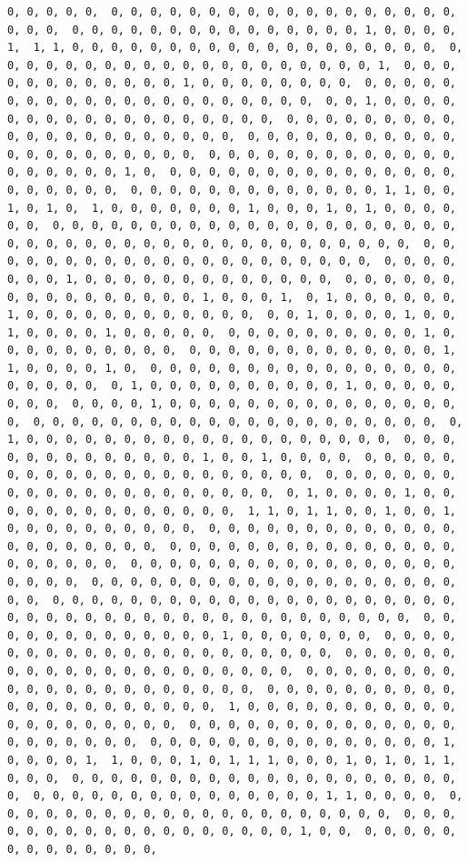 \documentclass[
]{article}
\begin{document}
\begin{verbatim}
0, 0, 0, 0, 0,  0, 0, 0, 0, 0, 0, 0, 0, 0, 0, 0, 0, 0, 0, 0, 0, 0, 0, 0, 0, 0,  0, 0, 0, 0, 0, 0, 0, 0, 0, 0, 0, 0, 0, 0, 0, 1, 0, 0, 0, 0, 1,  1, 1, 0, 0, 0, 0, 0, 0, 0, 0, 0, 0, 0, 0, 0, 0, 0, 0, 0, 0, 0,  0, 0, 0, 0, 0, 0, 0, 0, 0, 0, 0, 0, 0, 0, 0, 0, 0, 0, 0, 0, 1,  0, 0, 0, 0, 0, 0, 0, 0, 0, 0, 0, 0, 1, 0, 0, 0, 0, 0, 0, 0, 0,  0, 0, 0, 0, 0, 0, 0, 0, 0, 0, 0, 0, 0, 0, 0, 0, 0, 0, 0, 0, 0,  0, 0, 1, 0, 0, 0, 0, 0, 0, 0, 0, 0, 0, 0, 0, 0, 0, 0, 0, 0, 0,  0, 0, 0, 0, 0, 0, 0, 0, 0, 0, 0, 0, 0, 0, 0, 0, 0, 0, 0, 0, 0,  0, 0, 0, 0, 0, 0, 0, 0, 0, 0, 0, 0, 0, 0, 0, 0, 0, 0, 0, 0, 0,  0, 0, 0, 0, 0, 0, 0, 0, 0, 0, 0, 0, 0, 0, 0, 0, 0, 0, 0, 1, 0,  0, 0, 0, 0, 0, 0, 0, 0, 0, 0, 0, 0, 0, 0, 0, 0, 0, 0, 0, 0, 0,  0, 0, 0, 0, 0, 0, 0, 0, 0, 0, 0, 0, 0, 1, 1, 0, 0, 1, 0, 1, 0,  1, 0, 0, 0, 0, 0, 0, 0, 1, 0, 0, 0, 1, 0, 1, 0, 0, 0, 0, 0, 0,  0, 0, 0, 0, 0, 0, 0, 0, 0, 0, 0, 0, 0, 0, 0, 0, 0, 0, 0, 0, 0,  0, 0, 0, 0, 0, 0, 0, 0, 0, 0, 0, 0, 0, 0, 0, 0, 0, 0, 0, 0, 0,  0, 0, 0, 0, 0, 0, 0, 0, 0, 0, 0, 0, 0, 0, 0, 0, 0, 0, 0, 0, 0,  0, 0, 0, 0, 0, 0, 0, 1, 0, 0, 0, 0, 0, 0, 0, 0, 0, 0, 0, 0, 0,  0, 0, 0, 0, 0, 0, 0, 0, 0, 0, 0, 0, 0, 0, 0, 0, 1, 0, 0, 0, 1,  0, 1, 0, 0, 0, 0, 0, 0, 1, 0, 0, 0, 0, 0, 0, 0, 0, 0, 0, 0, 0,  0, 0, 1, 0, 0, 0, 0, 1, 0, 0, 1, 0, 0, 0, 0, 1, 0, 0, 0, 0, 0,  0, 0, 0, 0, 0, 0, 0, 0, 0, 0, 1, 0, 0, 0, 0, 0, 0, 0, 0, 0, 0,  0, 0, 0, 0, 0, 0, 0, 0, 0, 0, 0, 0, 0, 1, 1, 0, 0, 0, 0, 1, 0,  0, 0, 0, 0, 0, 0, 0, 0, 0, 0, 0, 0, 0, 0, 0, 0, 0, 0, 0, 0, 0,  0, 1, 0, 0, 0, 0, 0, 0, 0, 0, 0, 0, 1, 0, 0, 0, 0, 0, 0, 0, 0,  0, 0, 0, 0, 1, 0, 0, 0, 0, 0, 0, 0, 0, 0, 0, 0, 0, 0, 0, 0, 0,  0, 0, 0, 0, 0, 0, 0, 0, 0, 0, 0, 0, 0, 0, 0, 0, 0, 0, 0, 0, 0,  0, 1, 0, 0, 0, 0, 0, 0, 0, 0, 0, 0, 0, 0, 0, 0, 0, 0, 0, 0, 0,  0, 0, 0, 0, 0, 0, 0, 0, 0, 0, 0, 0, 0, 1, 0, 0, 1, 0, 0, 0, 0,  0, 0, 0, 0, 0, 0, 0, 0, 0, 0, 0, 0, 0, 0, 0, 0, 0, 0, 0, 0, 0,  0, 0, 0, 0, 0, 0, 0, 0, 0, 0, 0, 0, 0, 0, 0, 0, 0, 0, 0, 0, 0,  0, 1, 0, 0, 0, 0, 1, 0, 0, 0, 0, 0, 0, 0, 0, 0, 0, 0, 0, 0, 0,  1, 1, 0, 1, 1, 0, 0, 1, 0, 0, 1, 0, 0, 0, 0, 0, 0, 0, 0, 0, 0,  0, 0, 0, 0, 0, 0, 0, 0, 0, 0, 0, 0, 0, 0, 0, 0, 0, 0, 0, 0, 0,  0, 0, 0, 0, 0, 0, 0, 0, 0, 0, 0, 0, 0, 0, 0, 0, 0, 0, 0, 0, 0,  0, 0, 0, 0, 0, 0, 0, 0, 0, 0, 0, 0, 0, 0, 0, 0, 0, 0, 0, 0, 0,  0, 0, 0, 0, 0, 0, 0, 0, 0, 0, 0, 0, 0, 0, 0, 0, 0, 0, 0, 0, 0,  0, 0, 0, 0, 0, 0, 0, 0, 0, 0, 0, 0, 0, 0, 0, 0, 0, 0, 0, 0, 0,  0, 0, 0, 0, 0, 0, 0, 0, 0, 0, 0, 0, 0, 0, 0, 0, 0, 0, 0, 0, 0,  0, 0, 0, 0, 0, 0, 0, 0, 0, 0, 0, 0, 0, 1, 0, 0, 0, 0, 0, 0, 0,  0, 0, 0, 0, 0, 0, 0, 0, 0, 0, 0, 0, 0, 0, 0, 0, 0, 0, 0, 0, 0,  0, 0, 0, 0, 0, 0, 0, 0, 0, 0, 0, 0, 0, 0, 0, 0, 0, 0, 0, 0, 0,  0, 0, 0, 0, 0, 0, 0, 0, 0, 0, 0, 0, 0, 0, 0, 0, 0, 0, 0, 0, 0,  0, 0, 0, 0, 0, 0, 0, 0, 0, 0, 0, 0, 0, 0, 0, 0, 0, 0, 0, 0, 0,  1, 0, 0, 0, 0, 0, 0, 0, 0, 0, 0, 0, 0, 0, 0, 0, 0, 0, 0, 0, 0,  0, 0, 0, 0, 0, 0, 0, 0, 0, 0, 0, 0, 0, 0, 0, 0, 0, 0, 0, 0, 0,  0, 0, 0, 0, 0, 0, 0, 0, 0, 0, 0, 0, 0, 0, 0, 1, 0, 0, 0, 0, 1,  1, 0, 0, 0, 1, 0, 1, 1, 1, 0, 0, 0, 1, 0, 1, 0, 1, 1, 0, 0, 0,  0, 0, 0, 0, 0, 0, 0, 0, 0, 0, 0, 0, 0, 0, 0, 0, 0, 0, 0, 0, 0,  0, 0, 0, 0, 0, 0, 0, 0, 0, 0, 0, 0, 0, 0, 0, 1, 1, 0, 0, 0, 0,  0, 0, 0, 0, 0, 0, 0, 0, 0, 0, 0, 0, 0, 0, 0, 0, 0, 0, 0, 0, 0,  0, 0, 0, 0, 0, 0, 0, 0, 0, 0, 0, 0, 0, 0, 0, 0, 0, 0, 1, 0, 0,  0, 0, 0, 0, 0, 0, 0, 0, 0, 0, 0, 0, 0, 
\end{verbatim}
\end{document}
